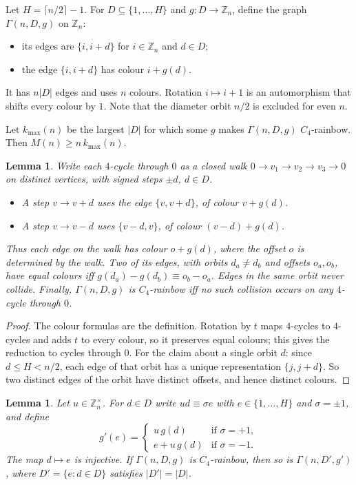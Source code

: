 \documentclass[11pt]{amsart}
\newtheorem{lemma}[theorem]{Lemma}
\theoremstyle{definition}
\newcommand{\Z}{\mathbb{Z}}
\newcommand{\M}{M}
\newcommand{\kmax}{k_{\max}}
\begin{document}
Let $H=\lceil n/2\rceil-1$. For $D\subseteq\{1,\dots,H\}$ and $g:D\to\Z_n$, define the
graph $\Gamma(n,D,g)$ on $\Z_n$:
\begin{itemize}
\item its edges are $\{i,i+d\}$ for $i\in\Z_n$ and $d\in D$;
\item the edge $\{i,i+d\}$ has colour $i+g(d)$.
\end{itemize}
It has $n|D|$ edges and uses $n$ colours. Rotation $i\mapsto i+1$ is an automorphism that
shifts every colour by $1$. Note that the diameter orbit $n/2$ is excluded for even $n$.

Let $\kmax(n)$ be the largest $|D|$ for which some $g$ makes $\Gamma(n,D,g)$
$C_4$-rainbow. Then $\M(n)\ge n\,\kmax(n)$.

\begin{lemma}\label{lem:walk}
Write each $4$-cycle through $0$ as a closed walk $0\to v_1\to v_2\to v_3\to0$ on
distinct vertices, with signed steps $\pm d$, $d\in D$.
\begin{itemize}
\item A step $v\to v+d$ uses the edge $\{v,v+d\}$, of colour $v+g(d)$.
\item A step $v\to v-d$ uses $\{v-d,v\}$, of colour $(v-d)+g(d)$.
\end{itemize}
Thus each edge on the walk has colour $o+g(d)$, where the offset $o$ is determined by the
walk. Two of its edges, with orbits $d_a\ne d_b$ and offsets $o_a,o_b$, have equal colours
iff $g(d_a)-g(d_b)\equiv o_b-o_a$. Edges in the same orbit never collide. Finally,
$\Gamma(n,D,g)$ is $C_4$-rainbow iff no such collision occurs on any $4$-cycle through $0$.
\end{lemma}

\begin{proof}
The colour formulas are the definition. Rotation by $t$ maps $4$-cycles to $4$-cycles and adds
$t$ to every colour, so it preserves equal colours; this gives the reduction to cycles
through $0$. For the claim about a single orbit $d$: since $d\le H<n/2$, each edge of that
orbit has a unique representation $\{j,j+d\}$. So two distinct edges of the orbit have
distinct offsets, and hence distinct colours.
\end{proof}

\begin{lemma}\label{lem:mult}
Let $u\in\Z_n^\times$. For $d\in D$ write $ud\equiv\sigma e$ with $e\in\{1,\dots,H\}$ and
$\sigma=\pm1$, and define
\[
  g'(e)=\begin{cases} u\,g(d) & \text{if } \sigma=+1,\\ e+u\,g(d) & \text{if } \sigma=-1.\end{cases}
\]
The map $d\mapsto e$ is injective. If $\Gamma(n,D,g)$ is $C_4$-rainbow, then so is
$\Gamma(n,D',g')$, where $D'=\{e: d\in D\}$ satisfies $|D'|=|D|$.
\end{lemma}
\end{document}
